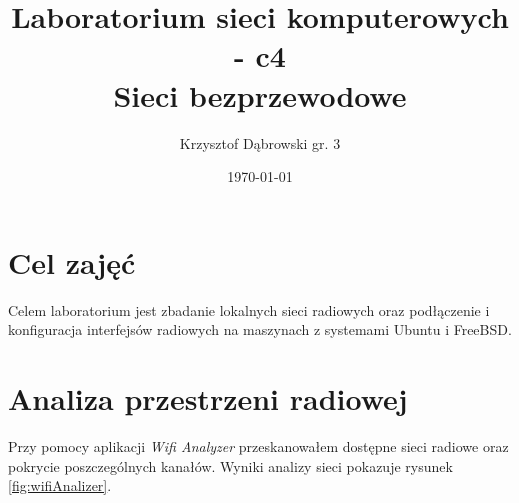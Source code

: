 \documentclass{article} %
\title{Laboratorium sieci komputerowych - c4 \\ Sieci bezprzewodowe}
\author{Krzysztof Dąbrowski gr. 3}
\date{\today}
\begin{document}
\maketitle{}
\tableofcontents{}

\section{Cel zajęć}
Celem laboratorium jest zbadanie lokalnych sieci radiowych oraz podłączenie i konfiguracja interfejsów radiowych na maszynach z systemami Ubuntu i FreeBSD.

\section{Analiza przestrzeni radiowej}
Przy pomocy aplikacji \textit{Wifi Analyzer} przeskanowałem dostępne sieci radiowe oraz pokrycie poszczególnych kanałów.
Wyniki analizy sieci pokazuje rysunek \ref{fig:wifiAnalizer}.
\end{document}
